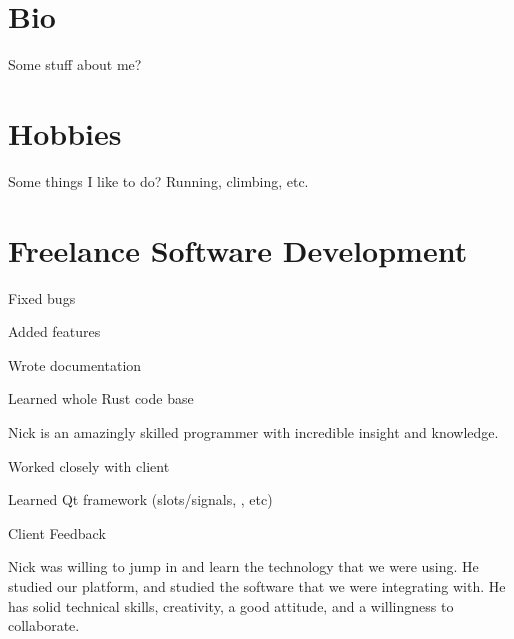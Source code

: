 \documentclass[letterpaper]{deedy-resume}
\begin{document}
\begin{minipage}[t]{0.30\textwidth} %

    \section{Bio}
    Some stuff about me?
    \vspace*{3em}

    \section{Hobbies}
    Some things I like to do? Running, climbing, etc.

\end{minipage} %
\vrule
\hfill
\begin{minipage}[t]{0.66\textwidth} %

    \section{Freelance Software Development}
	\begin{compactitem}
        \item Fixed bugs
        \item Added features
        \item Wrote documentation
        \item Learned whole Rust code base
	\end{compactitem}
        \parbox{0.5\textwidth}{%
            \textcolor{gray}{\faQuoteLeft}
            Nick is an amazingly skilled programmer with incredible insight and knowledge. 
        \textcolor{gray}{\faQuoteRight}
    }
    \vspace{3em}

	\begin{compactitem}
		\item Worked closely with client
        \item Learned Qt framework (slots/signals, \textellipsis, etc)
		\item 
        \item
        \item 
    \end{compactitem}
    Client Feedback\\
    \setlength{\aweboxleftmargin}{0.07\linewidth}
        \parbox{0.5\textwidth}{%
            \textcolor{gray}{\faQuoteLeft}
        Nick was willing to jump in and learn the technology that we were using. He
        studied our platform, and studied the software that we were integrating with. He has solid
        technical skills, creativity, a good attitude, and a willingness to collaborate.
        \textcolor{gray}{\faQuoteRight}
    }


\end{minipage}
\end{document}
